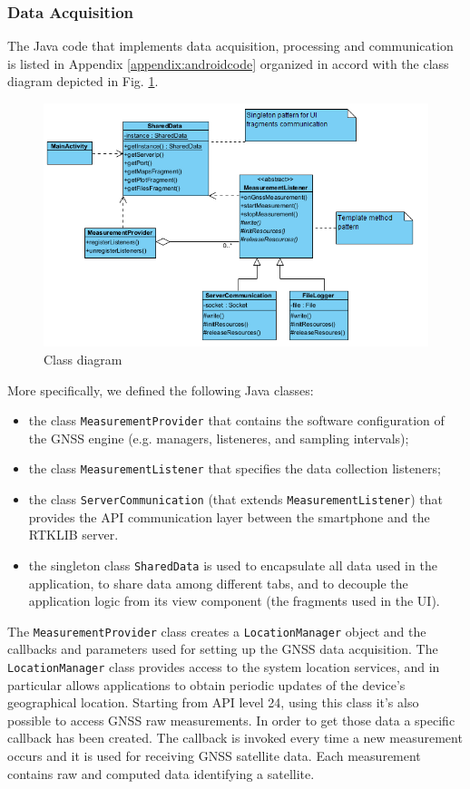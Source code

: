 \subsubsection*{Data Acquisition}
The Java code that implements data acquisition, processing and communication is listed in Appendix \ref{appendix:androidcode}
organized in accord with the class diagram depicted in Fig. \ref{FIG:class_diagram}. 
\begin{figure}[H] 
	\centering
	\includegraphics[scale=0.80,frame]{fig/class.png} 
	\caption{Class diagram}
	\label{FIG:class_diagram} 
\end{figure}
More specifically, we defined the following Java classes:
\begin{itemize}
\item 
the class \verb+MeasurementProvider+ that contains the software configuration of the GNSS engine (e.g. managers, listeneres, and sampling intervals);
\item 
the class  \verb+MeasurementListener+ that specifies the  data collection listeners;
\item 
the class \verb+ServerCommunication+ (that extends 
\verb+MeasurementListener+) that provides the API communication layer between the smartphone and the RTKLIB server.
\item 
the singleton class \verb+SharedData+ is used to encapsulate all data used in the application, to share data among different tabs, 
and to decouple the application logic from its view component (the fragments used in the UI).
\end{itemize}
The \verb+MeasurementProvider+ class creates a \verb+LocationManager+ object and the callbacks and parameters used for setting up the GNSS data acquisition.  
The \verb+LocationManager+ class provides access to the system location services, and in particular allows applications to obtain periodic updates of the device's geographical location. Starting from API level 24, using this class it's also possible to access GNSS raw measurements. In order to get those data a specific callback has been created. The callback is invoked every time  a new measurement occurs and it is used for receiving GNSS satellite data. Each measurement contains raw and computed data identifying a satellite. 
